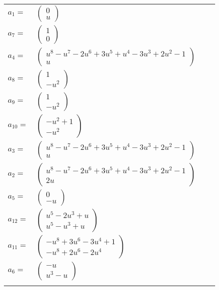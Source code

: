 \documentclass[1p]{elsarticle_modified}
\theoremstyle{definition}
\begin{document}
\begin{tabular}{m{7pt} m{180pt} m{7pt} m{180pt} }
\flushright $a_{1}=$&$\begin{pmatrix}0\\u\end{pmatrix}$ \\
\flushright $a_{7}=$&$\begin{pmatrix}1\\0\end{pmatrix}$ \\
\flushright $a_{4}=$&$\begin{pmatrix}u^8- u^7-2 u^6+3 u^5+u^4-3 u^3+2 u^2-1\\u\end{pmatrix}$ \\
\flushright $a_{8}=$&$\begin{pmatrix}1\\- u^2\end{pmatrix}$ \\
\flushright $a_{9}=$&$\begin{pmatrix}1\\- u^2\end{pmatrix}$ \\
\flushright $a_{10}=$&$\begin{pmatrix}- u^2+1\\- u^2\end{pmatrix}$ \\
\flushright $a_{3}=$&$\begin{pmatrix}u^8- u^7-2 u^6+3 u^5+u^4-3 u^3+2 u^2-1\\u\end{pmatrix}$ \\
\flushright $a_{2}=$&$\begin{pmatrix}u^8- u^7-2 u^6+3 u^5+u^4-3 u^3+2 u^2-1\\2 u\end{pmatrix}$ \\
\flushright $a_{5}=$&$\begin{pmatrix}0\\- u\end{pmatrix}$ \\
\flushright $a_{12}=$&$\begin{pmatrix}u^5-2 u^3+u\\u^5- u^3+u\end{pmatrix}$ \\
\flushright $a_{11}=$&$\begin{pmatrix}- u^8+3 u^6-3 u^4+1\\- u^8+2 u^6-2 u^4\end{pmatrix}$ \\
\flushright $a_{6}=$&$\begin{pmatrix}- u\\u^3- u\end{pmatrix}$\\&\end{tabular}
\end{document}
